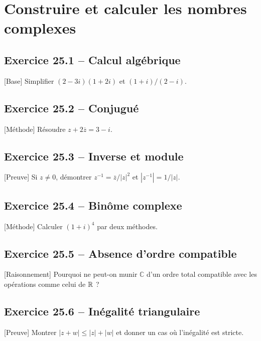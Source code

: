 \chapter{Construire et calculer les nombres complexes}
\section*{Exercice 25.1 -- Calcul algébrique}
[Base] Simplifier $(2-3i)(1+2i)$ et $(1+i)/(2-i)$.

\section*{Exercice 25.2 -- Conjugué}
[Méthode] Résoudre $z+2\overline z=3-i$.

\section*{Exercice 25.3 -- Inverse et module}
[Preuve] Si $z\ne0$, démontrer $z^{-1}=\overline z/|z|^2$ et $|z^{-1}|=1/|z|$.

\section*{Exercice 25.4 -- Binôme complexe}
[Méthode] Calculer $(1+i)^4$ par deux méthodes.

\section*{Exercice 25.5 -- Absence d’ordre compatible}
[Raisonnement] Pourquoi ne peut-on munir $\mathbb C$ d'un ordre total compatible avec les opérations comme celui de $\mathbb{R}$ ?

\section*{Exercice 25.6 -- Inégalité triangulaire}
[Preuve] Montrer $|z+w|\le|z|+|w|$ et donner un cas où l'inégalité est stricte.
